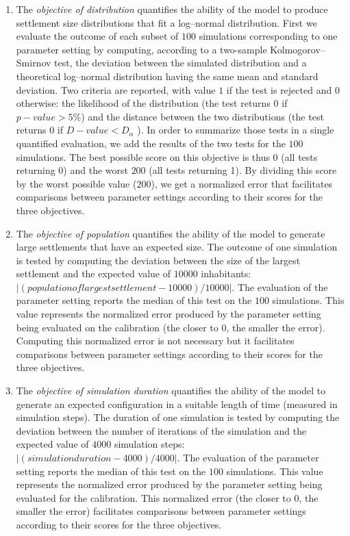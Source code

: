 \begin{enumerate}[label=(\arabic*),labelindent=0pt, leftmargin=*]
\item The \textit{objective of distribution} quantifies the ability of the model to produce settlement size distributions that fit a log–normal distribution. First we evaluate the outcome of each subset of $100$ simulations corresponding to one parameter setting by computing, according to a two-sample Kolmogorov–Smirnov test, the deviation between the simulated distribution and a theoretical log–normal distribution having the same mean and standard deviation. Two criteria are reported, with value $1$ if the test is rejected and $0$ otherwise: the likelihood of the distribution (the test returns $0$ if $p-value > 5\%$) and the distance between the two distributions (the test returns $0$ if $D-value < D_{\alpha}$   ). In order to summarize those tests in a single quantified evaluation, we add the results of the two tests for the $100$ simulations. The best possible score on this objective is thus $0$ (all tests returning $0$) and the worst $200$ (all tests returning 1). By dividing this score by the worst possible value ($200$), we get a normalized error that facilitates comparisons between parameter settings according to their scores for the three objectives.

\item The \textit{objective of population} quantifies the ability of the model to generate large settlements that have an expected size. The outcome of one simulation is tested by computing the deviation between the size of the largest settlement and the expected value of $\num{10000}$ inhabitants: $|(population of largest settlement −\num{10000})/\num{10000}|$. The evaluation of the parameter setting reports the median of this test on the $100$ simulations. This value represents the normalized error produced by the parameter setting being evaluated on the calibration (the closer to $0$, the smaller the error). Computing this normalized error is not necessary but it facilitates comparisons between parameter settings according to their scores for the three objectives.

\item The \textit{objective of simulation duration} quantifies the ability of the model to generate an expected configuration in a suitable length of time (measured in simulation steps). The duration of one simulation is tested by computing the deviation between the number of iterations of the simulation and the expected value of $\num{4000}$ simulation steps: $|(simulation duration − \num{4000})/\num{4000}|$. The evaluation of the parameter setting reports the median of this test on the $100$ simulations. This value represents the normalized error produced by the parameter setting being evaluated for the calibration. This normalized error (the closer to $0$, the smaller the error) facilitates comparisons between parameter settings according to their scores for the three objectives.
\end{enumerate}

